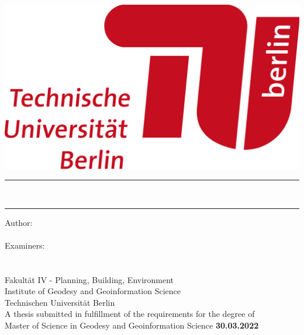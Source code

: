 

    
\begin{titlepage}
    \begin{center}
        \includegraphics[width=.25\textwidth,right]{picture/image1.png}
            \\
        \vspace*{0.8cm}
        {\Huge %
            \rule[1 ex]{\textwidth}{2 pt} %
            \textbf{\printTitle}\\
            \rule[-1 ex]{\textwidth}{2 pt} %
            }
        \vfil
        {\Large Author:} \\[0.5cm]
        { %
            {\Large \textbf{\printAuthor}} \\[0.2cm]
            }
        \vfil
        {\Large Examiners: }\\ [0.5cm]
        { %
            {\Large \textbf{\printSupervisor}} \\[0.2cm]
            {\large \textbf{\printAffSupervisor}} \\[0.2cm]
            }
        \vfil
        {Fakult\"at IV - Planning, Building, Environment \\Institute of Geodesy and Geoinformation Science  \\ Technischen Universit\"at Berlin } \\[2 pt]
        \vfil
        {A thesis submitted in fulfillment of the requirements for the degree of \\ Master of Science in Geodesy and Geoinformation Science}
        \vfil
        {\large\textbf{30.03.2022} \printDate}
    \end{center}
\end{titlepage}

